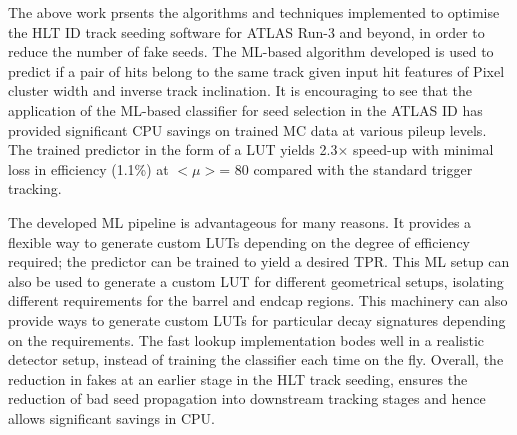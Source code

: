 The above work prsents the algorithms and techniques implemented to optimise the HLT ID track seeding software for ATLAS Run-3 and beyond, in order to reduce the number of fake seeds. The ML-based algorithm developed is used to predict if a pair of hits belong to the same track given input hit features of Pixel cluster width and inverse track inclination. It is encouraging to see that the application of the ML-based classifier for seed selection in the ATLAS ID has provided significant CPU savings on trained MC data at various pileup levels. The trained predictor in the form of a LUT yields 2.3$\times$ speed-up with minimal loss in efficiency (1.1\%) at $< \mu >$= 80 compared with the standard trigger tracking. 

The developed ML pipeline is advantageous for many reasons. It provides a flexible way to generate custom LUTs depending on the degree of efficiency required; the predictor can be trained to yield a desired TPR. This ML setup can also be used to generate a custom LUT for different geometrical setups, isolating different requirements for the barrel and endcap regions. This machinery can also provide ways to generate custom LUTs for particular decay signatures depending on the requirements. The fast lookup implementation bodes well in a realistic detector setup, instead of training the classifier each time on the fly. Overall, the reduction in fakes at an earlier stage in the HLT track seeding, ensures the reduction of bad seed propagation into downstream tracking stages and hence allows significant savings in CPU.


